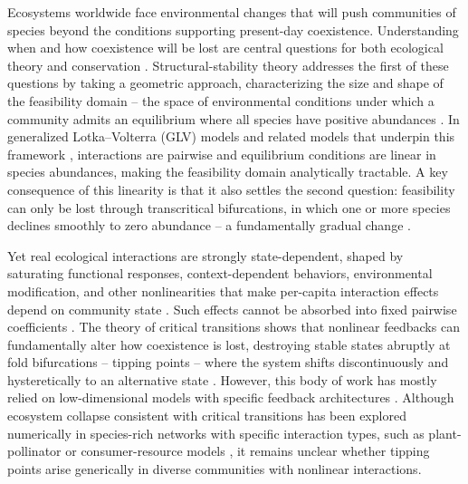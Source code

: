 \documentclass[
 reprint,
 amsmath,
 amssymb,
 aps,
 superscriptaddress,
]{revtex4-2}
\begin{document}
Ecosystems worldwide face environmental changes that will push communities of species beyond the conditions supporting present-day coexistence. Understanding when and how coexistence will be lost are central questions for both ecological theory and conservation \cite{scheffer_anticipating_2012}. Structural-stability theory addresses the first of these questions by taking a geometric approach, characterizing the size and shape of the feasibility domain -- the space of environmental conditions under which a community admits an equilibrium where all species have positive abundances \cite{rohr_structural_2014, grilli_feasibility_2017, saavedra_structural_2017, song_guideline_2018}. In generalized Lotka–Volterra (GLV) models and related models that underpin this framework \cite{cenci_structural_2018}, interactions are pairwise and equilibrium conditions are linear in species abundances, making the feasibility domain analytically tractable. A key consequence of this linearity is that it also settles the second question: feasibility can only be lost through transcritical bifurcations, in which one or more species declines smoothly to zero abundance -- a fundamentally gradual change \cite{grilli_feasibility_2017}.

Yet real ecological interactions are strongly state-dependent, shaped by saturating functional responses, context-dependent behaviors, environmental modification, and other nonlinearities that make per-capita interaction effects depend on community state \cite{wilbur_competition_1972, peacor_contribution_2001, mickalide_higher-order_2019, kelsic_counteraction_2015, miller_metapopulations_2021, lai_non-additive_2022, hsieh_surprising_2022}. Such effects cannot be absorbed into fixed pairwise coefficients \cite{levine_beyond_2017, kleinhesselink_detecting_2022}. The theory of critical transitions shows that nonlinear feedbacks can fundamentally alter how coexistence is lost, destroying stable states abruptly at fold bifurcations -- tipping points -- where the system shifts discontinuously and hysteretically to an alternative state \cite{may_thresholds_1977, scheffer_catastrophic_2001, rietkerk_self-organized_2004, scheffer_generic_2015, moreno-spiegelberg_how_2025, mumby_thresholds_2007}. However, this body of work has mostly relied on low-dimensional models with specific feedback architectures \cite{kefi_scaling_2022}. Although ecosystem collapse consistent with critical transitions has been explored numerically in species-rich networks with specific interaction types, such as plant-pollinator or consumer-resource models \cite{lever_sudden_2014, jiang_predicting_2018, dakos_critical_2014, karatayev_potential_2023}, it remains unclear whether tipping points arise generically in diverse communities with nonlinear interactions. 
\end{document}
